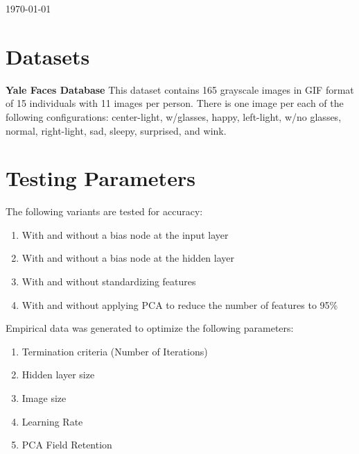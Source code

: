 \documentclass[12pt]{article}
\begin{document}
\begin{titlepage}

{\large \today}\\[3cm] %




\vfill %
\end{titlepage}

\newpage

\section{Datasets}
\textbf{Yale Faces Database} \quad This dataset contains 165 grayscale images in GIF format of 15 individuals with 11 images per person. There is one image per each of the following configurations: center-light, w/glasses, happy, left-light, w/no glasses, normal, right-light, sad, sleepy, surprised, and wink.

\section{Testing Parameters}
The following variants are tested for accuracy:
\begin{enumerate}
  \item With and without a bias node at the input layer
  \item With and without a bias node at the hidden layer
  \item With and without standardizing features
  \item With and without applying PCA to reduce the number of features to 95\%
\end{enumerate}
Empirical data was generated to optimize the following parameters:
\begin{enumerate}
  \item Termination criteria (Number of Iterations)
  \item Hidden layer size
  \item Image size
  \item Learning Rate
  \item PCA Field Retention
\end{enumerate}
\end{document}
